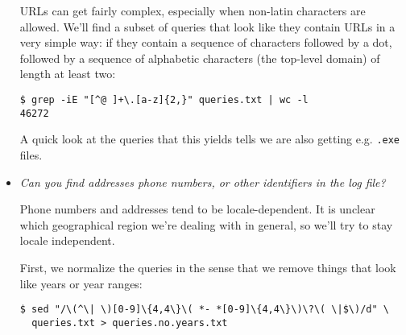 \begin{itemize}
URLs can get fairly complex, especially when non-latin characters are allowed.
We'll find a subset of queries that look like they contain URLs in a very
simple way: if they contain a sequence of characters followed by a dot,
followed by a sequence of alphabetic characters (the top-level domain) of
length at least two:

\begin{lstlisting}
$ grep -iE "[^@ ]+\.[a-z]{2,}" queries.txt | wc -l
46272
\end{lstlisting}

A quick look at the queries that this yields tells we are also getting e.g.
\texttt{.exe} files.






\item \emph{Can you find addresses phone numbers, or other identifiers in the
log file?}

Phone numbers and addresses tend to be locale-dependent. It is unclear which
geographical region we're dealing with in general, so we'll try to stay locale
independent.

First, we normalize the queries in the sense that we remove things that look
like years or year ranges:

\begin{lstlisting}
$ sed "/\(^\| \)[0-9]\{4,4\}\( *- *[0-9]\{4,4\}\)\?\( \|$\)/d" \
  queries.txt > queries.no.years.txt
\end{lstlisting}


\end{itemize}
